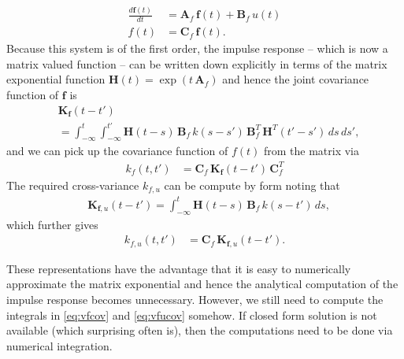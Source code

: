 \documentclass[journal]{IEEEtran}
\begin{document}
%
\begin{equation}
\begin{split}
  \frac{d\mathbf{f}(t)}{dt}
  &= \mathbf{A}_f \, \mathbf{f}(t) + \mathbf{B}_f \, u(t) \\
  f(t) &= \mathbf{C}_f \, \mathbf{f}(t).
\end{split}
\label{eq:ssgen}
\end{equation}
%
Because this system is of the first order, the impulse response -- which is now a matrix valued function -- can be written down explicitly in terms of the matrix exponential function $\mathbf{H}(t) = \exp(t \, \mathbf{A}_f)$ and hence the joint covariance function of $\mathbf{f}$ is
%
\begin{equation}
\begin{split}
  &\mathbf{K}_\mathbf{f}(t - t')
  \\ &
  =
  \int_{-\infty}^{t} \int_{-\infty}^{t'}
  \mathbf{H}(t - s) \, \mathbf{B}_f \, k(s - s') \,
  \mathbf{B}_f^T \, \mathbf{H}^T(t' - s') \, ds \, ds',
\end{split}
\label{eq:vfcov}
\end{equation}
%
and we can pick up the covariance function of $f(t)$ from the matrix via
%
\begin{equation}
\begin{split}
  k_f(t,t') &=
  \mathbf{C}_f \, \mathbf{K}_\mathbf{f}(t - t') \, \mathbf{C}_f^T
\end{split}
\label{eq:fcov2}
\end{equation}
%
The required cross-variance $k_{f,u}$ can be compute by form noting that
%
\begin{equation}
\begin{split}
  &\mathbf{K}_{\mathbf{f},u}(t - t')
  =
  \int_{-\infty}^{t} 
  \mathbf{H}(t - s) \, \mathbf{B}_f \, k(s - t') \, ds,
\end{split}
\label{eq:vfucov}
\end{equation}
%
which further gives
%
\begin{equation}
\begin{split}
  k_{f,u}(t,t') &=
  \mathbf{C}_f \, \mathbf{K}_{\mathbf{f},u}(t - t').
\end{split}
\label{eq:fucov2}
\end{equation}

These representations have the advantage that it is easy to numerically approximate the matrix exponential and hence the analytical computation of the impulse response becomes unnecessary. However, we still need to compute the integrals in \eqref{eq:vfcov} and \eqref{eq:vfucov} somehow. If closed form solution is not available (which surprising often is), then the computations need to be done via numerical integration.
\end{document}

